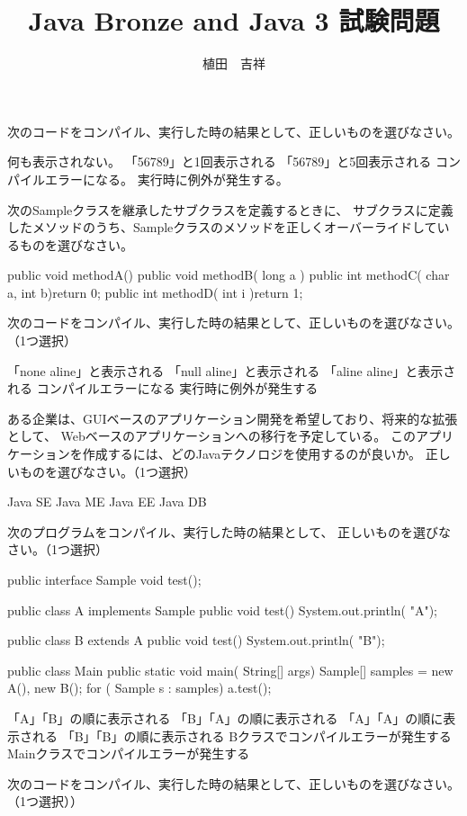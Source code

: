 \documentclass{jarticle}
\begin{document}
\title{Java Bronze and Java 3 試験問題}
\author{植田　吉祥}
\maketitle

次のコードをコンパイル、実行した時の結果として、正しいものを選びなさい。


何も表示されない。
「56789」と1回表示される
「56789」と5回表示される
コンパイルエラーになる。
実行時に例外が発生する。

次のSampleクラスを継承したサブクラスを定義するときに、
サブクラスに定義したメソッドのうち、Sampleクラスのメソッドを正しくオーバーライドしているものを選びなさい。


public void  methodA(){}
public  void methodB( long a ){}
public int methodC( char a, int b){return 0;}
public int methodD( int i ){return 1;}

次のコードをコンパイル、実行した時の結果として、正しいものを選びなさい。（1つ選択）

「none aline」と表示される
「null aline」と表示される
「aline aline」と表示される
コンパイルエラーになる
実行時に例外が発生する

ある企業は、GUIベースのアプリケーション開発を希望しており、将来的な拡張として、
Webベースのアプリケーションへの移行を予定している。
このアプリケーションを作成するには、どのJavaテクノロジを使用するのが良いか。
正しいものを選びなさい。（1つ選択）

Java SE
Java ME
Java EE
Java DB

次のプログラムをコンパイル、実行した時の結果として、
正しいものを選びなさい。（1つ選択）

public interface Sample {
    void test();
}

public class A implements Sample{
    public void test(){
        System.out.println( "A");
    }
}

public class B extends A {
    public void test(){
        System.out.println( "B");
    }
}

public class Main{
    public  static void main( String[] args){
        Sample[] samples = { new A(), new B()};
        for ( Sample s : samples){
            a.test();
        }
    }
}


「A」「B」の順に表示される
「B」「A」の順に表示される
「A」「A」の順に表示される
「B」「B」の順に表示される
Bクラスでコンパイルエラーが発生する
Mainクラスでコンパイルエラーが発生する

次のコードをコンパイル、実行した時の結果として、正しいものを選びなさい。（1つ選択））
\end{document}
